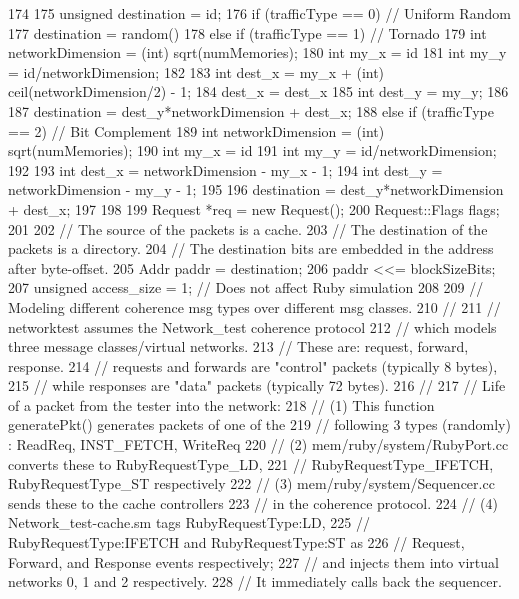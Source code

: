 \begin{DoxyCode}
174 {
175     unsigned destination = id;
176     if (trafficType == 0) { // Uniform Random
177         destination = random() %
178     } else if (trafficType == 1) { // Tornado
179         int networkDimension = (int) sqrt(numMemories);
180         int my_x = id%
181         int my_y = id/networkDimension;
182 
183         int dest_x = my_x + (int) ceil(networkDimension/2) - 1;
184         dest_x = dest_x%
185         int dest_y = my_y;
186 
187         destination = dest_y*networkDimension + dest_x;
188     } else if (trafficType == 2) { // Bit Complement
189         int networkDimension = (int) sqrt(numMemories);
190         int my_x = id%
191         int my_y = id/networkDimension;
192 
193         int dest_x = networkDimension - my_x - 1;
194         int dest_y = networkDimension - my_y - 1;
195 
196         destination = dest_y*networkDimension + dest_x;
197     }
198 
199     Request *req = new Request();
200     Request::Flags flags;
201 
202     // The source of the packets is a cache.
203     // The destination of the packets is a directory.
204     // The destination bits are embedded in the address after byte-offset.
205     Addr paddr =  destination;
206     paddr <<= blockSizeBits;
207     unsigned access_size = 1; // Does not affect Ruby simulation
208 
209     // Modeling different coherence msg types over different msg classes.
210     //
211     // networktest assumes the Network_test coherence protocol 
212     // which models three message classes/virtual networks.
213     // These are: request, forward, response.
214     // requests and forwards are "control" packets (typically 8 bytes),
215     // while responses are "data" packets (typically 72 bytes).
216     //
217     // Life of a packet from the tester into the network:
218     // (1) This function generatePkt() generates packets of one of the 
219     //     following 3 types (randomly) : ReadReq, INST_FETCH, WriteReq
220     // (2) mem/ruby/system/RubyPort.cc converts these to RubyRequestType_LD,
221     //     RubyRequestType_IFETCH, RubyRequestType_ST respectively
222     // (3) mem/ruby/system/Sequencer.cc sends these to the cache controllers
223     //     in the coherence protocol.
224     // (4) Network_test-cache.sm tags RubyRequestType:LD,
225     //     RubyRequestType:IFETCH and RubyRequestType:ST as
226     //     Request, Forward, and Response events respectively; 
227     //     and injects them into virtual networks 0, 1 and 2 respectively.
228     //     It immediately calls back the sequencer.
}
\end{DoxyCode}
